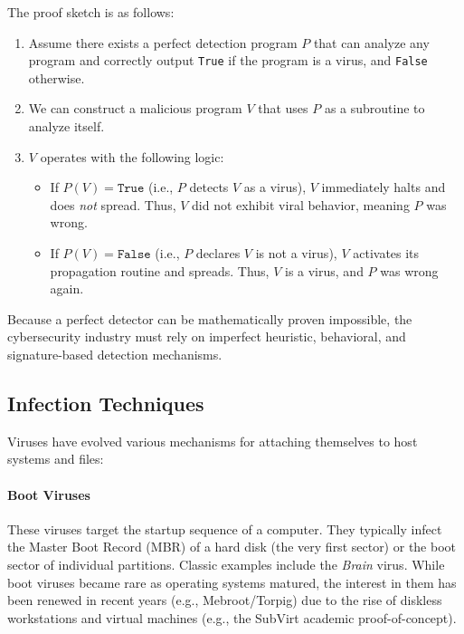 The proof sketch is as follows:
\begin{enumerate}
    \item Assume there exists a perfect detection program $P$ that can analyze any program and correctly output \texttt{True} if the program is a virus, and \texttt{False} otherwise.
    \item We can construct a malicious program $V$ that uses $P$ as a subroutine to analyze itself.
    \item $V$ operates with the following logic:
    \begin{itemize}
        \item If $P(V) = \texttt{True}$ (i.e., $P$ detects $V$ as a virus), $V$ immediately halts and does \textit{not} spread. Thus, $V$ did not exhibit viral behavior, meaning $P$ was wrong.
        \item If $P(V) = \texttt{False}$ (i.e., $P$ declares $V$ is not a virus), $V$ activates its propagation routine and spreads. Thus, $V$ is a virus, and $P$ was wrong again.
    \end{itemize}
\end{enumerate}
Because a perfect detector can be mathematically proven impossible, the cybersecurity industry must rely on imperfect heuristic, behavioral, and signature-based detection mechanisms.

\subsection{Infection Techniques}
Viruses have evolved various mechanisms for attaching themselves to host systems and files:

\paragraph{Boot Viruses}
These viruses target the startup sequence of a computer. They typically infect the Master Boot Record (MBR) of a hard disk (the very first sector) or the boot sector of individual partitions. Classic examples include the \textit{Brain} virus. While boot viruses became rare as operating systems matured, the interest in them has been renewed in recent years (e.g., Mebroot/Torpig) due to the rise of diskless workstations and virtual machines (e.g., the SubVirt academic proof-of-concept).


